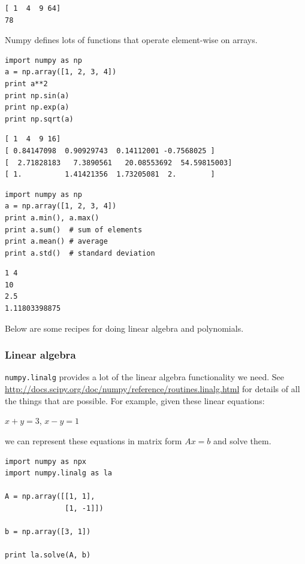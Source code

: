\documentclass[11pt]{article}
\begin{document}
\begin{verbatim}
[ 1  4  9 64]
78
\end{verbatim}

Numpy defines lots of functions that operate element-wise on arrays.

\begin{verbatim}
import numpy as np
a = np.array([1, 2, 3, 4])
print a**2
print np.sin(a)
print np.exp(a)
print np.sqrt(a)
\end{verbatim}

\begin{verbatim}
[ 1  4  9 16]
[ 0.84147098  0.90929743  0.14112001 -0.7568025 ]
[  2.71828183   7.3890561   20.08553692  54.59815003]
[ 1.          1.41421356  1.73205081  2.        ]
\end{verbatim}

\begin{verbatim}
import numpy as np
a = np.array([1, 2, 3, 4])
print a.min(), a.max()
print a.sum()  # sum of elements
print a.mean() # average
print a.std()  # standard deviation
\end{verbatim}

\begin{verbatim}
1 4
10
2.5
1.11803398875
\end{verbatim}


Below are some recipes for doing linear algebra and polynomials.


\subsubsection{Linear algebra}
\label{sec:org662ad0d}
\texttt{numpy.linalg} provides a lot of the linear algebra functionality we need. See \url{http://docs.scipy.org/doc/numpy/reference/routines.linalg.html} for details of all the things that are possible. For example, given these linear equations:

\(x + y = 3\), 
\(x - y = 1\)

we can represent these equations in matrix form \(A x = b\) and solve them.

\begin{verbatim}
import numpy as npx
import numpy.linalg as la

A = np.array([[1, 1],
              [1, -1]])

b = np.array([3, 1])

print la.solve(A, b)
\end{verbatim}
\end{document}
